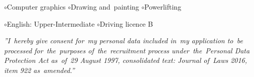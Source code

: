 \documentclass[11pt,a4paper]{article}
\newcommand*\header[1]{
    \noindent\raisebox{.1cm}{\color{MidnightBlue}\rule{1.5cm}{.1cm}\hspace{.2cm}\raisebox{-.1cm}{\large\bf #1}}}
\begin{document}

    \bigskip

    \header{Interests and~hobbies}

    \smallskip
    \hspace{.4cm}
    $\circ$\hspace{.18cm}Computer graphics
    \hspace{.32cm}
    $\circ$\hspace{.18cm}Drawing and~painting
    \hspace{.32cm}
    $\circ$\hspace{.18cm}Powerlifting


    \bigskip

    \header{Miscellaneous}

    \smallskip
    \hspace{.4cm}
    $\circ$\hspace{.18cm}English: Upper-Intermediate
    \hspace{.32cm}
    $\circ$\hspace{.18cm}Driving licence B


    \bigskip

    \noindent\textit{\small
        ''I~hereby give consent for~my personal data included in~my application to~be processed for~the~purposes
        of~the~recruitment process under~the~Personal Data Protection Act as~of~29 August 1997, consolidated text:
        Journal of~Laws 2016, item 922 as~amended.''}
\end{document}
